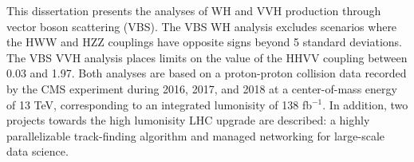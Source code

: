 \begin{dissertationabstract}
    This dissertation presents the analyses of WH and VVH production through vector boson scattering (VBS). 
    The VBS WH analysis excludes scenarios where the HWW and HZZ couplings have opposite signs beyond 5 standard deviations. 
    The VBS VVH analysis places limits on the value of the HHVV coupling between 0.03 and 1.97. 
    Both analyses are based on a proton-proton collision data recorded by the CMS experiment during 2016, 2017, and 2018 at a center-of-mass energy of 13 TeV, corresponding to an integrated lumonisity of 138 fb$^{-1}$. 
    In addition, two projects towards the high lumonisity LHC upgrade are described: a highly parallelizable track-finding algorithm and managed networking for large-scale data science. 
\end{dissertationabstract}
